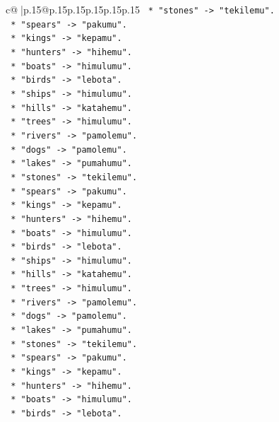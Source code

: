 \documentclass{article}
\begin{document}
{\begin{supertabular}{c@{$\;$}|p{.15\linewidth}@{}p{.15\linewidth}p{.15\linewidth}p{.15\linewidth}p{.15\linewidth}p{.15\linewidth}}
{{{\texttt{        *   "stones" {-}> "tekilemu".} \\
\texttt{        *   "spears" {-}> "pakumu".} \\
\texttt{        *   "kings" {-}> "kepamu".} \\
\texttt{        *   "hunters" {-}> "hihemu".} \\
\texttt{        *   "boats" {-}> "himulumu".} \\
\texttt{        *   "birds" {-}> "lebota".} \\
\texttt{        *   "ships" {-}> "himulumu".} \\
\texttt{        *   "hills" {-}> "katahemu".} \\
\texttt{        *   "trees" {-}> "himulumu".} \\
\texttt{        *   "rivers" {-}> "pamolemu".} \\
\texttt{        *   "dogs" {-}> "pamolemu".} \\
\texttt{        *   "lakes" {-}> "pumahumu".} \\
\texttt{        *   "stones" {-}> "tekilemu".} \\
\texttt{        *   "spears" {-}> "pakumu".} \\
\texttt{        *   "kings" {-}> "kepamu".} \\
\texttt{        *   "hunters" {-}> "hihemu".} \\
\texttt{        *   "boats" {-}> "himulumu".} \\
\texttt{        *   "birds" {-}> "lebota".} \\
\texttt{        *   "ships" {-}> "himulumu".} \\
\texttt{        *   "hills" {-}> "katahemu".} \\
\texttt{        *   "trees" {-}> "himulumu".} \\
\texttt{        *   "rivers" {-}> "pamolemu".} \\
\texttt{        *   "dogs" {-}> "pamolemu".} \\
\texttt{        *   "lakes" {-}> "pumahumu".} \\
\texttt{        *   "stones" {-}> "tekilemu".} \\
\texttt{        *   "spears" {-}> "pakumu".} \\
\texttt{        *   "kings" {-}> "kepamu".} \\
\texttt{        *   "hunters" {-}> "hihemu".} \\
\texttt{        *   "boats" {-}> "himulumu".} \\
\texttt{        *   "birds" {-}> "lebota".} \\
}}}
\end{supertabular}}
\end{document}
